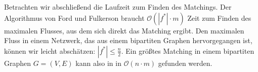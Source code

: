 
Betrachten wir abschließend die Laufzeit zum Finden des Matchings. Der Algorithmus von Ford und Fulkerson braucht $\mathcal{O}(|f^*| \cdot m)$ Zeit zum Finden des maximalen Flusses, aus dem sich direkt das Matching ergibt. Den maximalen Fluss in einem Netzwerk, das aus einem bipartiten Graphen hervorgegangen ist, können wir leicht abschätzen: $|f^*| \le \frac{n}{2}$. Ein größtes Matching in einem bipartiten Graphen $G = (V, E)$ kann also in in $\mathcal{O}(n \cdot m)$ gefunden werden.

